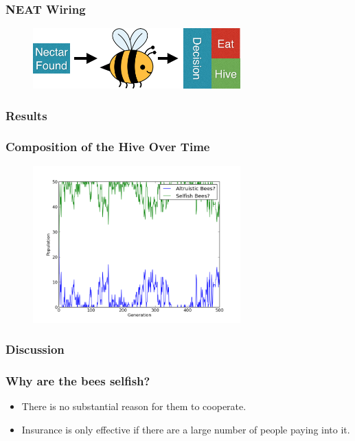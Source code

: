 \documentclass{beamer}
\begin{document}
        \begin{frame}[t]\frametitle{NEAT Wiring}
          \begin{figure}
          \includegraphics[width=8cm]{bee_diagrams/naive_sysem.png}
          \end{figure}
        \end{frame}


      \subsubsection{Results} %
      \label{ssub:results}

        \begin{frame}[t]\frametitle{Composition of the Hive Over Time}
          \begin{figure}
          \includegraphics[width=8cm]{results/s_bees.png}
          \end{figure}
        \end{frame}
      

      \subsubsection{Discussion} %
      \label{ssub:discussion}
        \begin{frame}[c]\frametitle{Why are the bees selfish?}
            
          \begin{itemize}
            \item There is no substantial reason for them to cooperate.
            \item Insurance is only effective if there are a large number of
                  people paying into it.
          \end{itemize}
        
        \end{frame}
\end{document}
